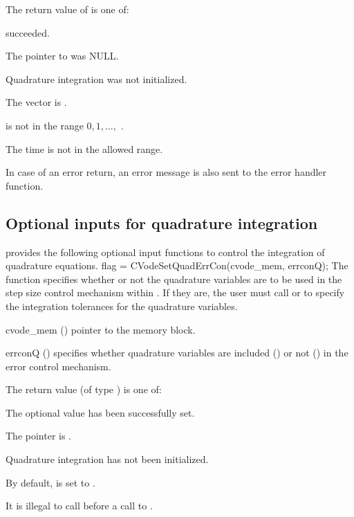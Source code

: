 {
  The return value  of  is one of:
  \begin{args}
  \item[\Id{CV\_SUCCESS}]
     succeeded.
  \item[\Id{CV\_MEM\_NULL}]
    The pointer to  was NULL.
  \item[\Id{CV\_NO\_QUAD}] 
    Quadrature integration was not initialized.
  \item[\Id{CV\_BAD\_DKY}] 
    The vector  is .
  \item[\Id{CV\_BAD\_K}]
     is not in the range $0, 1, \ldots,$ .
  \item[\Id{CV\_BAD\_T}] 
    The time  is not in the allowed range.
  \end{args}
}
{
  In case of an error return, an error message is also sent to the error handler function.
}


\subsection{Optional inputs for quadrature integration}\label{ss:quad_optional_input}
{\cvodes} provides the following optional input functions to control the integration
of quadrature equations.
{
 flag = CVodeSetQuadErrCon(cvode\_mem, errconQ);
}
{
  The function  specifies whether or not the
  quadrature variables are to be used in the step size control mechanism
  within {\cvodes}.  If they are, the user must call 
  or  to specify the 
  integration tolerances for the quadrature variables.  
}
{
  \begin{args}
  \item[cvode\_mem] ()
    pointer to the {\cvodes} memory block.
  \item[errconQ] ()
    specifies whether quadrature variables are included () or not
    () in the error control mechanism.
  \end{args}
}
{
  The return value  (of type ) is one of:
  \begin{args}
  \item[\Id{CV\_SUCCESS}] 
    The optional value has been successfully set.
  \item[\Id{CV\_MEM\_NULL}]
    The  pointer is .
  \item[\Id{CV\_NO\_QUAD}]
    Quadrature integration has not been initialized.
  \end{args}
}
{
  By default,  is set to . 

  {\warn}It is illegal to call  before a call 
  to .
}


